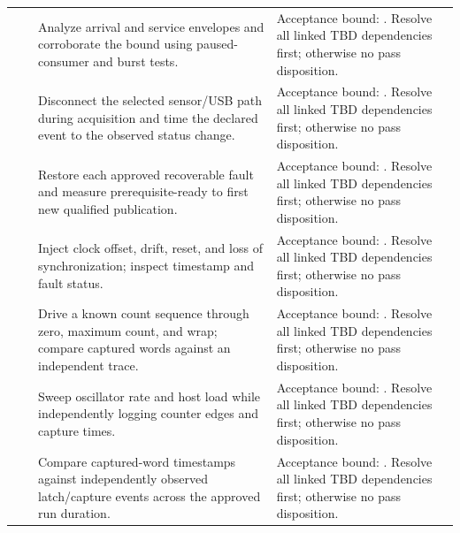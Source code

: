 \begin{landscape}
\begin{tabularx}{\linewidth}{L{2cm}L{3cm}Y Y}
 & \par {} & Analyze arrival and service envelopes and corroborate the bound using paused-consumer and burst tests. & Acceptance bound: . Resolve all linked TBD dependencies first; otherwise no pass disposition.\\
 & \par {} & Disconnect the selected sensor/USB path during acquisition and time the declared event to the observed status change. & Acceptance bound: . Resolve all linked TBD dependencies first; otherwise no pass disposition.\\
 & \par {} & Restore each approved recoverable fault and measure prerequisite-ready to first new qualified publication. & Acceptance bound: . Resolve all linked TBD dependencies first; otherwise no pass disposition.\\
 & \par {} & Inject clock offset, drift, reset, and loss of synchronization; inspect timestamp and fault status. & Acceptance bound: . Resolve all linked TBD dependencies first; otherwise no pass disposition.\\
 & \par {} & Drive a known count sequence through zero, maximum count, and wrap; compare captured words against an independent trace. & Acceptance bound: . Resolve all linked TBD dependencies first; otherwise no pass disposition.\\
 & \par {} & Sweep oscillator rate and host load while independently logging counter edges and capture times. & Acceptance bound: . Resolve all linked TBD dependencies first; otherwise no pass disposition.\\
 & \par {} & Compare captured-word timestamps against independently observed latch/capture events across the approved run duration. & Acceptance bound: . Resolve all linked TBD dependencies first; otherwise no pass disposition.\\

\end{tabularx}
\end{landscape}
